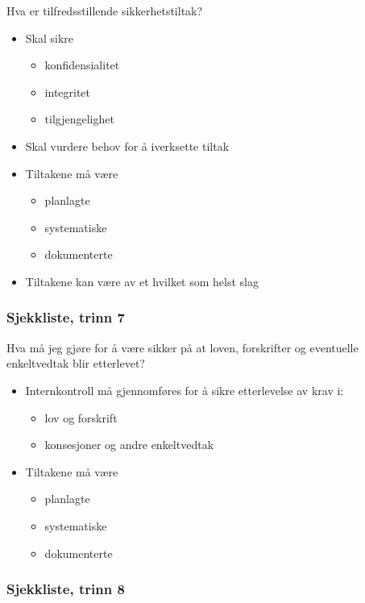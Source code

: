 \documentclass[11pt]{article}
\begin{document}
    Hva er tilfredsstillende sikkerhetstiltak?
\begin{itemize}
\item Skal sikre

\begin{itemize}
\item konfidensialitet
\item integritet
\item tilgjengelighet
\end{itemize}

\item Skal vurdere behov for å iverksette tiltak
\item Tiltakene må være

\begin{itemize}
\item planlagte
\item systematiske
\item dokumenterte
\end{itemize}

\item Tiltakene kan være av et hvilket som helst slag
\end{itemize}
\subsubsection{Sjekkliste, trinn 7}
\label{sec-18.1.7}

    Hva må jeg gjøre for å være sikker på at loven, forskrifter og eventuelle enkeltvedtak blir etterlevet?
\begin{itemize}
\item Internkontroll må gjennomføres for å sikre etterlevelse av krav i:

\begin{itemize}
\item lov og forskrift
\item konsesjoner og andre enkeltvedtak
\end{itemize}

\item Tiltakene må være

\begin{itemize}
\item planlagte
\item systematiske
\item dokumenterte
\end{itemize}

\end{itemize}
\subsubsection{Sjekkliste, trinn 8}
\label{sec-18.1.8}
\end{document}
